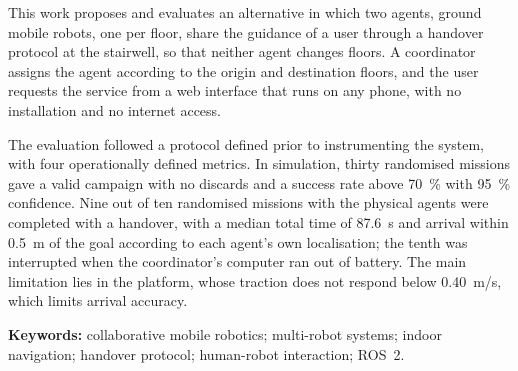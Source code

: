 This work proposes and evaluates an alternative in which two agents, ground mobile
robots, one per floor, share the guidance of a user through a handover protocol at the
stairwell, so that neither agent changes floors. A coordinator assigns the agent
according to the origin and destination floors, and the user requests the
service from a web interface that runs on any phone, with no installation and no
internet access.

The evaluation followed a protocol defined prior to instrumenting the system, with
four operationally defined metrics. In simulation, thirty randomised missions gave a
valid campaign with no discards and a success rate above 70~\% with 95~\% confidence. Nine out of ten randomised missions with the physical
agents were completed with a handover, with a median total time of 87.6~s and arrival
within 0.5~m of the goal according to each agent's own localisation; the tenth was
interrupted when the coordinator's computer ran out of battery. The main limitation
lies in the platform, whose traction does not respond below 0.40~m/s, which limits
arrival accuracy.

\vspace{1em}
\textbf{Keywords:} collaborative mobile robotics; multi-robot systems; indoor
navigation; handover protocol; human-robot interaction; ROS~2.
